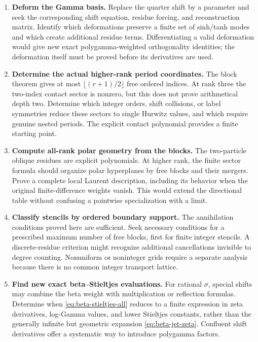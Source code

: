 \begin{enumerate}[label=\textbf{\arabic*.},leftmargin=*]
\item \textbf{Deform the Gamma basis.}
Replace the quarter shift by a parameter and seek the corresponding
shift equation, residue forcing, and reconstruction matrix. Identify
which deformations preserve a finite set of sinh/tanh modes and
which create additional residue terms. Differentiating a valid
deformation would give new exact polygamma-weighted orthogonality
identities; the deformation itself must be proved before its
derivatives are used.

\item \textbf{Determine the actual higher-rank period coordinates.}
The block theorem gives at most
$\lfloor(r+1)/2\rfloor$ free ordered indices. At rank three the
two-index contact sector is nonzero, but this does not prove
arithmetical depth two. Determine which integer orders, shift
collisions, or label symmetries reduce these sectors to single
Hurwitz values, and which require genuine nested periods.
The explicit contact polynomial provides a finite starting point.

\item \textbf{Compute all-rank polar geometry from the blocks.}
The two-particle oblique residues are explicit polynomials.
At higher rank, the finite sector formula should organize polar
hyperplanes by free blocks and their mergers. Prove a complete
local Laurent description, including its behavior when the original
finite-difference weights vanish. This would extend the directional
table without confusing a pointwise specialization with a limit.

\item \textbf{Classify stencils by ordered boundary support.}
The annihilation conditions proved here are sufficient. Seek
necessary conditions for a prescribed maximum number of free
blocks, first for finite integer stencils. A discrete-residue
criterion might recognize additional cancellations invisible to
degree counting. Nonuniform or noninteger grids require a separate
analysis because there is no common integer transport lattice.

\item \textbf{Find new exact beta--Stieltjes evaluations.}
For rational $\sigma$, special shifts may combine the beta weight
with multiplication or reflection formulas. Determine when
\eqref{eq:beta-stieltjes-all} reduces to a finite expression in
zeta derivatives, log-Gamma values, and lower Stieltjes constants,
rather than the generally infinite but geometric expansion
\eqref{eq:beta-jet-zeta}. Confluent shift derivatives offer a
systematic way to introduce polygamma factors.


\end{enumerate}
